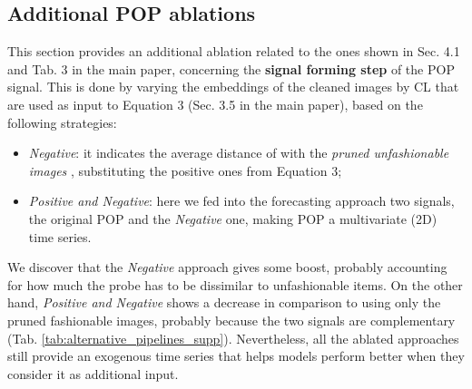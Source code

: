 \documentclass[runningheads]{llncs}
\newcommand{\snamebig}[0] {POP\xspace}
\begin{document}
\subsection{Additional POP ablations}\label{sec:ablations}
This section provides an additional ablation related to the ones shown in Sec. 4.1 and Tab. 3 in the main paper, concerning the \textbf{signal forming step} of the \snamebig signal. This is done by varying the embeddings of the cleaned images by CL that are used as input to Equation 3 (Sec. 3.5 in the main paper), based on the following strategies: 
\begin{itemize}[noitemsep, leftmargin=*]
    \item{\emph{Negative}}: it indicates the average distance of  with the \emph{pruned unfashionable images} , substituting the positive ones from Equation 3;
    \item{\emph{Positive and Negative}}: here we fed into the forecasting approach two signals, the original POP and the \emph{Negative} one, making POP a multivariate (2D) time series.
\end{itemize}
We discover that the \emph{Negative} approach gives some boost, probably accounting for how much the probe has to be dissimilar to unfashionable items. On the other hand, \emph{Positive and Negative} shows a decrease in comparison to using only the pruned fashionable images, probably because the two signals are complementary (Tab. \ref{tab:alternative_pipelines_supp}). Nevertheless, all the ablated approaches still provide an exogenous time series that helps models perform better when they consider it as additional input.
\begin{table}[h]
\scriptsize
    \centering
    \caption{ Alternative versions of the signal forming step, comparing to the one proposed in Sec. 3.5, represented here as \snamebig, on both the \emph{first order setup} and \emph{release setup} of VISUELLE. Lower is better for both metrics.}
    \setlength\extrarowheight{1pt}
    
    \label{tab:alternative_pipelines_supp}
\end{table}
\end{document}
